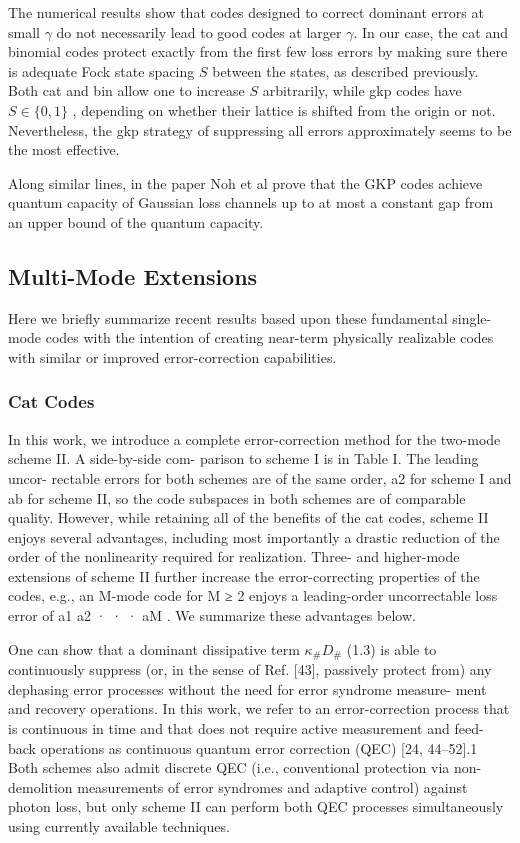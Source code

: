 \documentclass[12]{amsart}
\newcommand\0{\mathbf{0}}
\newcommand\<{\langle}
\renewcommand\>{\rangle}
\begin{document}
The numerical results show that codes designed to correct dominant errors at small $\gamma$ do not necessarily lead to good codes at larger $\gamma$. In our case, the cat and binomial codes protect exactly from the first few loss errors by making sure there is adequate Fock state spacing $S$ between the states, as described previously. Both cat and bin allow one to increase $S$ arbitrarily, while gkp codes have $S \in \{0, 1\}$ \cite{albert2017performance}, depending on whether their lattice is shifted from the origin or not. Nevertheless, the gkp strategy of suppressing all errors approximately seems to be the most effective.

Along similar lines, in the paper \cite{noh2018improved} Noh et al prove that the GKP codes achieve quantum capacity of Gaussian loss channels up to at most a constant gap from an upper bound of the quantum capacity.

\subsection{Multi-Mode Extensions}

Here we briefly summarize recent results based upon these fundamental single-mode codes with the intention of creating near-term physically realizable codes with similar or improved error-correction capabilities.

\subsubsection{Cat Codes}\label{sec:multi-cat}

In this work, we introduce a complete error-correction method for the two-mode scheme II. A side-by-side com- parison to scheme I is in Table I. The leading uncor- rectable errors for both schemes are of the same order, a2 for scheme I and ab for scheme II, so the code subspaces in both schemes are of comparable quality. However, while retaining all of the benefits of the cat codes, scheme II enjoys several advantages, including most importantly a drastic reduction of the order of the nonlinearity required for realization. Three- and higher-mode extensions of scheme II further increase the error-correcting properties of the codes, e.g., an M-mode code for M ≥ 2 enjoys a leading-order uncorrectable loss error of a1 a2 · · · aM . We summarize these advantages below.

One can show that a dominant dissipative term $\kappa_\# D_\#$ (1.3) is able to continuously suppress (or, in the sense of Ref. [43], passively protect from) any dephasing error processes without the need for error syndrome measure- ment and recovery operations. In this work, we refer to an error-correction process that is continuous in time and that does not require active measurement and feed- back operations as continuous quantum error correction (QEC) [24, 44–52].1 Both schemes also admit discrete QEC (i.e., conventional protection via non-demolition measurements of error syndromes and adaptive control) against photon loss, but only scheme II can perform both QEC processes simultaneously using currently available techniques.
\end{document}
